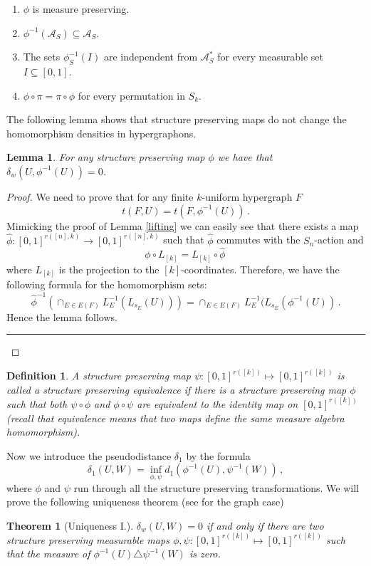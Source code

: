 \documentclass [11pt] {article}
\newcommand{\qed} {\hspace {0.1in} \rule {1.5mm} {3.5mm}}
\newtheorem{lemma}{Lemma}[section]
\newtheorem{theorem}{Theorem}
\newtheorem{definition}{Definition}[section]
\def\to{\rightarrow}
\begin{document}
\begin{enumerate}
\item $\phi$ is measure preserving.
\item $\phi^{-1}(\mathcal{A}_S)\subseteq\mathcal{A}_S$.
\item The sets $\phi_S^{-1}(I)$ are independent 
from $\mathcal{A}_S^*$ for every measurable set $I\subseteq [0,1]$.
\item $\phi\circ\pi=\pi\circ\phi$ for every permutation in $S_k$.
\end{enumerate}

The following lemma shows that structure preserving maps do not 
change the homomorphism densities in hypergraphons.

\begin{lemma} \label{lem41} For any structure preserving map $\phi$ 
we have that $\delta_w(U,\phi^{-1}(U))=0$.
\end{lemma}
\begin{proof}
We need to prove that for any finite $k$-uniform hypergraph $F$
$$t(F,U)=t(F,\phi^{-1}(U))\,.$$
Mimicking the proof of Lemma \ref{lifting} we can easily
see that there exists a map
$\hat{\phi}: [0,1]^{r([n],k)}\to [0,1]^{r([n],k)}$ such that
$\hat{\phi}$ commutes with the $S_n$-action and
$$\phi\circ L_{[k]}=L_{[k]}\circ \hat{\phi}\,$$
where $ L_{[k]}$ is the projection to the $[k]$-coordinates.
Therefore, we have the following formula for the homomorphism sets:
$$\hat{\phi}^{-1}\left(\cap_{E\in E(F)} L^{-1}_E(L_{s_E} (U))\right)=
\cap_{E\in E(F)} L^{-1}_E(L_{s_E}(\phi^{-1}(U))\,.$$
Hence the lemma follows. \qed \end{proof}
\begin{definition}\label{strequ}
 A structure preserving map $\psi:[0,1]^{r([k])}\mapsto
  [0,1]^{r([k])}$ is called a structure preserving equivalence if 
there is a structure preserving map $\phi$ such that both 
$\psi\circ\phi$ and $\phi\circ\psi$ 
are equivalent  to the identity map on $[0,1]^{r([k])}$ (recall that
equivalence means that two maps define the same measure algebra homomorphism).
\end{definition}
Now we introduce the pseudodistance $\delta_1$ by the formula
$$\delta_1(U,W)=\inf_{\phi,\psi}d_1(\phi^{-1}(U),\psi^{-1}(W))\,,$$
where $\phi$ and $\psi$ run through all the structure preserving 
transformations.
We will prove the following uniqueness theorem (see \cite{Lovaszunique}
for the graph case)

\begin{theorem}[Uniqueness I.] \label{uni1}$\delta_w(U,W)=0$ if and only if 
there are two structure preserving measurable maps
$\phi,\psi:[0,1]^{r([k])}\mapsto [0,1]^{r([k])}$
such that the measure of $\phi^{-1}(U)\triangle\psi^{-1}(W)$ is zero.
\end{theorem}
\end{document}
